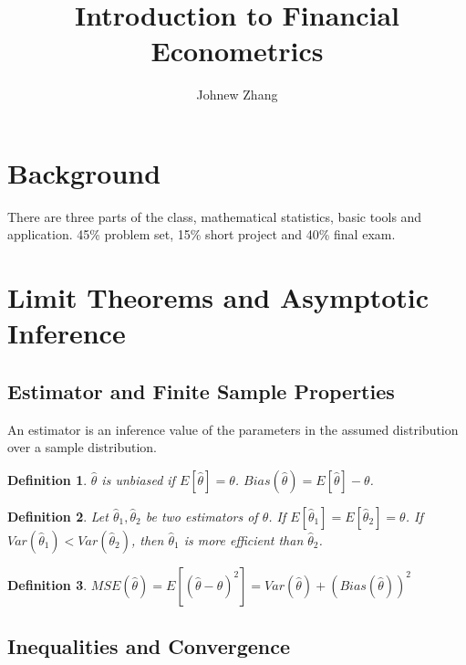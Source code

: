 \documentclass[11pt, a4paper, oneside]{article}
\title{Introduction to Financial Econometrics}
\author{Johnew Zhang}
\newtheorem{mydef}{Definition}
\theoremstyle{definition}
\theoremstyle{proposition}
\theoremstyle{corollary}
\theoremstyle{lemma}
\theoremstyle{theorem}
\begin{document}
 

\def\angl#1{{%
\vbox{\hrule height .2pt 
\kern 1pt 
\hbox{$\scriptstyle {#1}\kern 1pt$}%
}\kern-.05pt \vrule width .2pt 
}} 

\def\tcelife#1{{\buildrel \circ \over e}_{#1}}

\maketitle

\hline

\tableofcontents
\addcontentsline 

\newpage

\section*{Background}

There are three parts of the class, mathematical statistics, basic tools and application. 45\% problem set, 15\% short project and 40\% final exam.

\section{Limit Theorems and Asymptotic Inference}
\subsection{Estimator and Finite Sample Properties}
An estimator is an inference value of the parameters in the assumed distribution over a sample distribution. 

\begin{mydef}
$\hat{\theta}$ is unbiased if $E[\hat{\theta}] = \theta$. $Bias(\hat{\theta}) = E[\hat{\theta}]-\theta$. 
\end{mydef}

\begin{mydef}
Let $\hat{\theta}_1, \hat{\theta}_2$ be two estimators of $\theta$. If $E[\hat{\theta}_1] = E[\hat{\theta}_2] = \theta$. If $Var(\hat{\theta}_1) < Var(\hat{\theta}_2)$, then $\hat{\theta}_1$ is more efficient than $\hat{\theta}_2$. 
\end{mydef}

\begin{mydef}
$MSE(\hat{\theta}) = E[(\hat{\theta} - \theta)^2] = Var(\hat{\theta}) + (Bias(\hat{\theta}))^2$
\end{mydef}

\subsection{Inequalities and Convergence}
\end{document}
